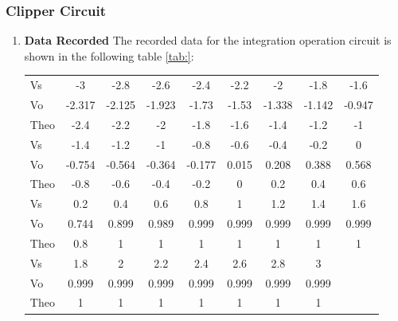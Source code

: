     \subsubsection{Clipper Circuit}
    \begin{enumerate}[I]
        \item \textbf{Data Recorded}\newline
            The recorded data for the integration operation circuit is shown in the following table \ref{tab:}:
            \begin{table}[h]
                \centering
                \begin{tabular}{l|cccccccc}
                    \hline
                    \midrule
                    Vs   & -3     & -2.8   & -2.6   & -2.4   & -2.2  & -2     & -1.8   & -1.6   \\
                    Vo   & -2.317 & -2.125 & -1.923 & -1.73  & -1.53 & -1.338 & -1.142 & -0.947 \\
                    Theo & -2.4   & -2.2   & -2     & -1.8   & -1.6  & -1.4   & -1.2   & -1     \\
                    \midrule
                    \midrule
                    Vs   & -1.4   & -1.2   & -1     & -0.8   & -0.6  & -0.4   & -0.2   & 0      \\
                    Vo   & -0.754 & -0.564 & -0.364 & -0.177 & 0.015 & 0.208  & 0.388  & 0.568  \\
                    Theo & -0.8   & -0.6   & -0.4   & -0.2   & 0     & 0.2    & 0.4    & 0.6    \\
                    \midrule
                    \midrule
                    Vs   & 0.2    & 0.4    & 0.6    & 0.8    & 1     & 1.2    & 1.4    & 1.6    \\
                    Vo   & 0.744  & 0.899  & 0.989  & 0.999  & 0.999 & 0.999  & 0.999  & 0.999  \\
                    Theo & 0.8    & 1      & 1      & 1      & 1     & 1      & 1      & 1      \\
                    \midrule
                    \midrule
                    Vs   & 1.8    & 2      & 2.2    & 2.4    & 2.6   & 2.8    & 3      &        \\
                    Vo   & 0.999  & 0.999  & 0.999  & 0.999  & 0.999 & 0.999  & 0.999  &        \\
                    Theo & 1      & 1      & 1      & 1      & 1     & 1      & 1      &        \\
                    \midrule

\end{tabular}
\end{table}
\end{enumerate}
